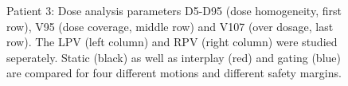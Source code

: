 \documentclass[type=dr, dr=rernat, accentcolor=tud7b,colorbacktitle, bigchapter, openright, twoside, 12pt ]{tudthesis}
\begin{document}
\begin{figure}[H]
{ }
\caption{Patient 3: Dose analysis parameters D5-D95 (dose homogeneity, first row), V95 (dose coverage, middle row) and V107 (over dosage, last row). 
The LPV (left column) and RPV (right column) were studied seperately. Static (black) as well as interplay (red) and gating (blue) 
are compared for four different motions and different safety margins.}
\label{static_interplay_gating_Pat03}
\end{figure}

\newpage 
\end{document}
